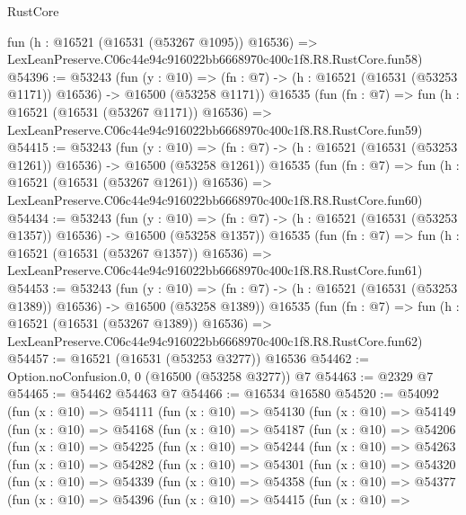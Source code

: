 \begin{lexlean}{RustCore}
\begin{coremodule}
    fun (h : @16521 (@16531 (@53267 @1095)) @16536) =>
    LexLeanPreserve.C06c44e94c916022bb6668970c400c1f8.R8.RustCore.fun58)
@54396 := @53243
    (fun (y : @10) =>
    (fn : @7) -> (h : @16521 (@16531 (@53253 @1171)) @16536) -> @16500 (@53258 @1171))
    @16535
    (fun (fn : @7) =>
    fun (h : @16521 (@16531 (@53267 @1171)) @16536) =>
    LexLeanPreserve.C06c44e94c916022bb6668970c400c1f8.R8.RustCore.fun59)
@54415 := @53243
    (fun (y : @10) =>
    (fn : @7) -> (h : @16521 (@16531 (@53253 @1261)) @16536) -> @16500 (@53258 @1261))
    @16535
    (fun (fn : @7) =>
    fun (h : @16521 (@16531 (@53267 @1261)) @16536) =>
    LexLeanPreserve.C06c44e94c916022bb6668970c400c1f8.R8.RustCore.fun60)
@54434 := @53243
    (fun (y : @10) =>
    (fn : @7) -> (h : @16521 (@16531 (@53253 @1357)) @16536) -> @16500 (@53258 @1357))
    @16535
    (fun (fn : @7) =>
    fun (h : @16521 (@16531 (@53267 @1357)) @16536) =>
    LexLeanPreserve.C06c44e94c916022bb6668970c400c1f8.R8.RustCore.fun61)
@54453 := @53243
    (fun (y : @10) =>
    (fn : @7) -> (h : @16521 (@16531 (@53253 @1389)) @16536) -> @16500 (@53258 @1389))
    @16535
    (fun (fn : @7) =>
    fun (h : @16521 (@16531 (@53267 @1389)) @16536) =>
    LexLeanPreserve.C06c44e94c916022bb6668970c400c1f8.R8.RustCore.fun62)
@54457 := @16521 (@16531 (@53253 @3277)) @16536
@54462 := Option.noConfusion.{0, 0} (@16500 (@53258 @3277)) @7
@54463 := @2329 @7
@54465 := @54462 @54463 @7
@54466 := @16534 @16580
@54520 := @54092
    (fun (x : @10) =>
    @54111
      (fun (x : @10) =>
      @54130
        (fun (x : @10) =>
        @54149
          (fun (x : @10) =>
          @54168
            (fun (x : @10) =>
            @54187
              (fun (x : @10) =>
              @54206
                (fun (x : @10) =>
                @54225
                  (fun (x : @10) =>
                  @54244
                    (fun (x : @10) =>
                    @54263
                      (fun (x : @10) =>
                      @54282
                        (fun (x : @10) =>
                        @54301
                          (fun (x : @10) =>
                          @54320
                            (fun (x : @10) =>
                            @54339
                              (fun (x : @10) =>
                              @54358
                                (fun (x : @10) =>
                                @54377
                                  (fun (x : @10) =>
                                  @54396
                                    (fun (x : @10) =>
                                    @54415
                                      (fun (x : @10) =>

\end{coremodule}
\end{lexlean}
